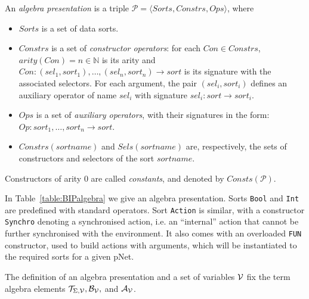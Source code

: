 \documentclass[smallcondensed]{svjour3}
\newcommand{\noteSB}[2][color=green!40, size=\tiny]{\todo[#1]{{\bf Simon: } {#2}}}
\newcommand{\cT}{\ensuremath{\mathcal{T}}}
\newcommand{\cV}{\ensuremath{\mathcal{V}}}
\newcommand{\signature}{\ensuremath{\Sigma}}
\newcommand{\variables}{\ensuremath{\cV}}
\newcommand{\Talg}{\ensuremath{\cT_{\signature,\variables}}}
\def\AlgA{\mathcal{A}}
\def\AlgB{\mathcal{B}}
\newcommand{\mdash}{---}
\begin{document}
\def\APres{\mathcal{P}}
\begin{definition}
	An \emph{algebra presentation} is a triple $\APres=\langle\mathit{Sorts},\mathit{Constrs},\mathit{Ops}\rangle$, where
	
	\begin{itemize}
		\item $Sorts$ is a set of data sorts.
		\item $\mathit{Constrs}$ is a set of \emph{constructor operators}: for each $\mathit{Con} \in \mathit{Constrs}$, $arity(Con)=n \in \mathbb{N}$ is its arity 
		and $Con : (\mathit{sel}_1,\mathit{sort}_1), \dots, (\mathit{sel}_n,\mathit{sort}_n) \rightarrow \mathit{sort}$ is its signature with the associated selectors.
		For each argument, the pair $(\mathit{sel}_i,\mathit{sort}_i)$ defines an auxiliary
		operator of name $\mathit{sel}_i$ with signature $\mathit{sel}_i : \mathit{sort} \rightarrow \mathit{sort}_i$.
		\item $Ops$ is a set of \emph{auxiliary operators}, with their
		signatures in the form: \\ $Op : \mathit{sort}_1, \dots,  \mathit{sort}_n \rightarrow
		\mathit{sort}$.
		\item $\mathit{Constrs}(\mathit{sortname})$ and $\mathit{Sels}(\mathit{sortname})$ are, respectively, the sets of
		constructors and selectors of the sort $\mathit{sortname}$.
	\end{itemize}
	Constructors of arity 0 are called \emph{constants}, and denoted by $\mathit{Consts}(\APres)$.
\end{definition}

In Table~\ref{table:BIPalgebra} we give an algebra presentation.
Sorts \texttt{Bool} and \texttt{Int} are predefined with standard operators.
Sort \texttt{Action} is similar, with a constructor \texttt{Synchro} denoting
a synchronised action, i.e. an ``internal'' action that cannot be
further synchronised with the environment. It also comes with an
overloaded \texttt{FUN} constructor, used to build actions with
arguments, which will be instantiated to the required sorts for a given
pNet.

The definition of an algebra presentation and a set of variables
$\P$ fix the term algebra elements $\Talg, \AlgB_{\P},$ and $\AlgA_\P$.
\end{document}
